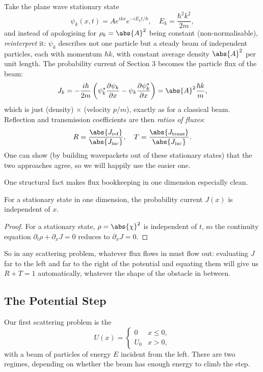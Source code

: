 Take the plane wave stationary state
$$
\psi_k(x, t) = A e^{ikx} e^{-i E_k t/\hbar}, \quad E_k = \frac{\hbar^2 k^2}{2m},
$$
and instead of apologising for $\rho_k = \abs{A}^2$ being constant (non-normalisable), \emph{reinterpret} it: $\psi_k$ describes not one particle but a steady beam of independent particles, each with momentum $\hbar k$, with constant average density $\abs{A}^2$ per unit length. The probability current of Section 3 becomes the particle flux of the beam:
$$
J_k = -\frac{i \hbar}{2m}\left( \psi_k^* \frac{\partial \psi_k}{\partial x} - \psi_k \frac{\partial \psi_k^*}{\partial x} \right) = \abs{A}^2 \frac{\hbar k}{m},
$$
which is just (density) $\times$ (velocity $p/m$), exactly as for a classical beam. Reflection and transmission coefficients are then \emph{ratios of fluxes}:
$$
R = \frac{\abs{J_{\text{ref}}}}{\abs{J_{\text{inc}}}}, \quad T = \frac{\abs{J_{\text{trans}}}}{\abs{J_{\text{inc}}}}.
$$
One can show (by building wavepackets out of these stationary states) that the two approaches agree, so we will happily use the easier one.

One structural fact makes flux bookkeeping in one dimension especially clean.

\begin{proposition}
    For a stationary state in one dimension, the probability current $J(x)$ is independent of $x$.
\end{proposition}
\begin{proof}
    For a stationary state, $\rho = \abs{\chi}^2$ is independent of $t$, so the continuity equation $\partial_t \rho + \partial_x J = 0$ reduces to $\partial_x J = 0$.
\end{proof}

So in any scattering problem, whatever flux flows in must flow out: evaluating $J$ far to the left and far to the right of the potential and equating them will give us $R + T = 1$ automatically, whatever the shape of the obstacle in between.

\subsection{The Potential Step}

Our first scattering problem is the 
$$
U(x) = \begin{cases}
    0 & x \leq 0, \\
    U_0 & x > 0,
\end{cases}
$$
with a beam of particles of energy $E$ incident from the left. There are two regimes, depending on whether the beam has enough energy to climb the step.

